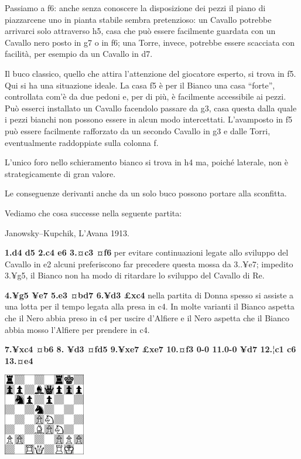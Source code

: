 \documentclass[
]{article}
\begin{document}
Passiamo a f6: anche senza conoscere la disposizione dei pezzi il piano
di piazzarcene uno in pianta stabile sembra pretenzioso: un Cavallo
potrebbe arrivarci solo attraverso h5, casa che può essere facilmente
guardata con un Cavallo nero posto in g7 o in f6; una Torre, invece,
potrebbe essere scacciata con facilità, per esempio da un Cavallo in d7.

Il buco classico, quello che attira l'attenzione del giocatore esperto,
si trova in f5. Qui si ha una situazione ideale. La casa f5 è per il
Bianco una casa ``forte'', controllata com'è da due pedoni e, per di
più, è facilmente accessibile ai pezzi. Può esserci installato un
Cavallo facendolo passare da g3, casa questa dalla quale i pezzi bianchi
non possono essere in alcun modo intercettati. L'avamposto in f5 può
essere facilmente rafforzato da un secondo Cavallo in g3 e dalle Torri,
eventualmente raddoppiate sulla colonna f.

L'unico foro nello schieramento bianco si trova in h4 ma, poiché
laterale, non è strategicamente di gran valore.

Le conseguenze derivanti anche da un solo buco possono portare alla
sconfitta.

Vediamo che cosa successe nella seguente partita:

Janowsky--Kupchik, L'Avana 1913.

\textbf{1.d4 d5 2.c4 e6 3.¤c3 ¤f6} per evitare continuazioni legate allo
sviluppo del Cavallo in e2 alcuni preferiscono far precedere questa
mossa da 3..¥e7; impedito 3.¥g5, il Bianco non ha modo di ritardare lo
sviluppo del Cavallo di Re.

\textbf{4.¥g5 ¥e7 5.e3 ¤bd7 6.¥d3 £xc4} nella partita di Donna spesso si
assiste a una lotta per il tempo legata alla presa in c4. In molte
varianti il Bianco aspetta che il Nero abbia preso in c4 per uscire
d'Alfiere e il Nero aspetta che il Bianco abbia mosso l'Alfiere per
prendere in c4.

\textbf{7.¥xc4 ¤b6 8. ¥d3 ¤fd5 9.¥xe7 £xe7 10.¤f3 0-0 11.0-0 ¥d7 12.¦c1
c6 13.¤e4}

\includegraphics[width=1.40972in,height=1.40972in]{vertopal_109f12be458a423d8f3cc838880eaea2/media/image23.png}
\end{document}
